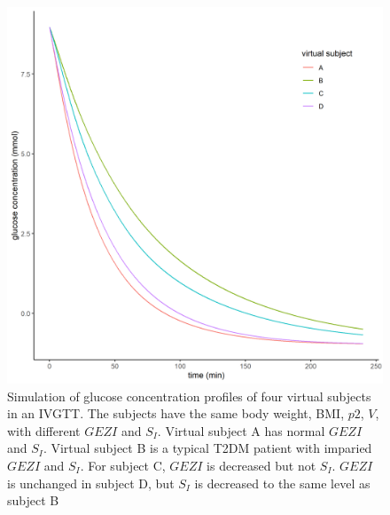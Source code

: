 \documentclass[utf8]{frontiersSCNS} %
\begin{document}
\begin{figure}[h!]
\begin{center}
\includegraphics[width=15cm]{p.PNG}
\end{center}
\caption{Simulation of glucose concentration profiles of four virtual subjects in an IVGTT. The subjects have the same body weight, BMI, $p2$, $V$, with different $GEZI$ and $S_I$. Virtual subject A has normal $GEZI$ and $S_I$. Virtual subject B is a typical T2DM patient with imparied $GEZI$ and $S_I$. For subject C, $GEZI$ is decreased but not $S_I$. $GEZI$ is unchanged in subject D, but $S_I$ is decreased to the same level as subject B}
\label{fig: simu}
\end{figure}
\end{document}
